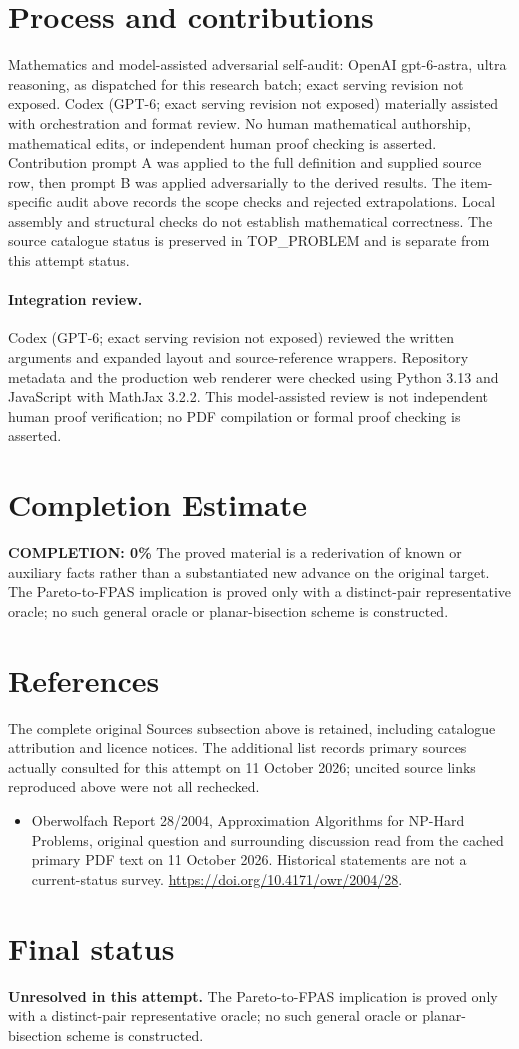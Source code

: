 \documentclass[11pt]{article}
\begin{document}
\section{Process and contributions}
Mathematics and model-assisted adversarial self-audit: OpenAI gpt-6-astra, ultra reasoning, as dispatched for this research batch; exact serving revision not exposed. Codex (GPT-6; exact serving revision not exposed) materially assisted with orchestration and format review. No human mathematical authorship, mathematical edits, or independent human proof checking is asserted.
Contribution prompt A was applied to the full definition and supplied source row, then prompt B was applied adversarially to the derived results. The item-specific audit above records the scope checks and rejected extrapolations. Local assembly and structural checks do not establish mathematical correctness. The source catalogue status is preserved in TOP\_PROBLEM and is separate from this attempt status.
\paragraph{Integration review.} Codex (GPT-6; exact serving revision not exposed) reviewed the written arguments and expanded layout and source-reference wrappers. Repository metadata and the production web renderer were checked using Python 3.13 and JavaScript with MathJax 3.2.2. This model-assisted review is not independent human proof verification; no PDF compilation or formal proof checking is asserted.

\section{Completion Estimate}
\noindent\textbf{COMPLETION: 0\%}
The proved material is a rederivation of known or auxiliary facts rather than a substantiated new advance on the original target. The Pareto-to-FPAS implication is proved only with a distinct-pair representative oracle; no such general oracle or planar-bisection scheme is constructed.
\section{References}
The complete original Sources subsection above is retained, including catalogue attribution and licence notices. The additional list records primary sources actually consulted for this attempt on 11 October 2026; uncited source links reproduced above were not all rechecked.
\begin{itemize}
\item Oberwolfach Report 28/2004, Approximation Algorithms for NP-Hard Problems, original question and surrounding discussion read from the cached primary PDF text on 11 October 2026. Historical statements are not a current-status survey. \url{https://doi.org/10.4171/owr/2004/28}.
\end{itemize}
\section{Final status}
\textbf{Unresolved in this attempt.} The Pareto-to-FPAS implication is proved only with a distinct-pair representative oracle; no such general oracle or planar-bisection scheme is constructed.
\end{document}
